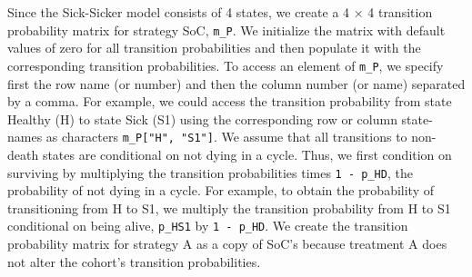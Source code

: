 \documentclass[
]{article}
\begin{document}
Since the Sick-Sicker model consists of 4 states, we create a 4 \(\times\) 4 transition probability matrix for strategy SoC, \texttt{m\_P}. We initialize the matrix with default values of zero for all transition probabilities and then populate it with the corresponding transition probabilities. To access an element of \texttt{m\_P}, we specify first the row name (or number) and then the column number (or name) separated by a comma. For example, we could access the transition probability from state Healthy (H) to state Sick (S1) using the corresponding row or column state-names as characters \texttt{m\_P{[}"H",\ "S1"{]}}. We assume that all transitions to non-death states are conditional on not dying in a cycle. Thus, we first condition on surviving by multiplying the transition probabilities times \texttt{1\ -\ p\_HD}, the probability of not dying in a cycle. For example, to obtain the probability of transitioning from H to S1, we multiply the transition probability from H to S1 conditional on being alive, \texttt{p\_HS1} by \texttt{1\ -\ p\_HD}. We create the transition probability matrix for strategy A as a copy of SoC's because treatment A does not alter the cohort's transition probabilities.
\end{document}
